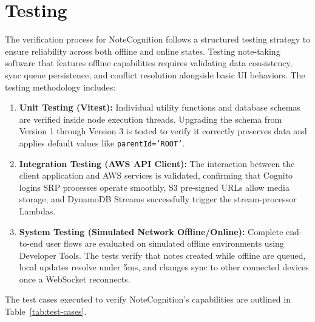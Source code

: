 \documentclass[12pt, a4paper, oneside]{report}
\begin{document}
\section{Testing}
The verification process for NoteCognition follows a structured testing strategy to ensure reliability across both offline and online states. Testing note-taking software that features offline capabilities requires validating data consistency, sync queue persistence, and conflict resolution alongside basic UI behaviors. The testing methodology includes:
\begin{enumerate}
    \item \textbf{Unit Testing (Vitest):} Individual utility functions and database schemas are verified inside node execution threads. Upgrading the schema from Version 1 through Version 3 is tested to verify it correctly preserves data and applies default values like \texttt{parentId='ROOT'}.
    \item \textbf{Integration Testing (AWS API Client):} The interaction between the client application and AWS services is validated, confirming that Cognito logins SRP processes operate smoothly, S3 pre-signed URLs allow media storage, and DynamoDB Streams successfully trigger the stream-processor Lambdas.
    \item \textbf{System Testing (Simulated Network Offline/Online):} Complete end-to-end user flows are evaluated on simulated offline environments using Developer Tools. The tests verify that notes created while offline are queued, local updates resolve under 5ms, and changes sync to other connected devices once a WebSocket reconnects.
\end{enumerate}

The test cases executed to verify NoteCognition's capabilities are outlined in Table~\ref{tab:test-cases}.
\end{document}
